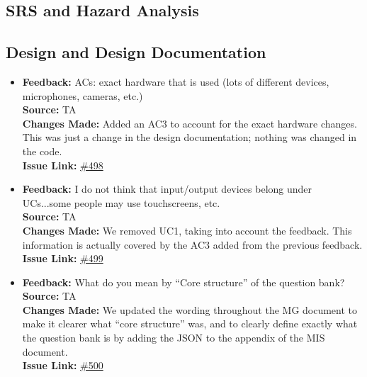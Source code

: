 \documentclass{article}
\begin{document}

\subsection{SRS and Hazard Analysis}

\subsection{Design and Design Documentation}
\begin{itemize}

    \item 
      \textbf{Feedback:} ACs: exact hardware that is used (lots of different devices, microphones, cameras, etc.) \\
      \textbf{Source:} TA \\
      \textbf{Changes Made:} Added an AC3 to account for the exact hardware changes. This was just a change in the design documentation; nothing was changed in the code. \\
      \textbf{Issue Link:} \href{https://github.com/parishanizam/TeleHealth/issues/498}{\#498}
    
    \item
      \textbf{Feedback:} I do not think that input/output devices belong under UCs...some people may use touchscreens, etc. \\
      \textbf{Source:} TA \\
      \textbf{Changes Made:} We removed UC1, taking into account the feedback. This information is actually covered by the AC3 added from the previous feedback. \\
      \textbf{Issue Link:} \href{https://github.com/parishanizam/TeleHealth/issues/499}{\#499}
    
    \item
      \textbf{Feedback:} What do you mean by “Core structure” of the question bank? \\
      \textbf{Source:} TA \\
      \textbf{Changes Made:} We updated the wording throughout the MG document to make it clearer what “core structure” was, and to clearly define exactly what the question bank is by adding the JSON to the appendix of the MIS document. \\
      \textbf{Issue Link:} \href{https://github.com/parishanizam/TeleHealth/issues/500}{\#500}
    

\end{itemize}
\end{document}
